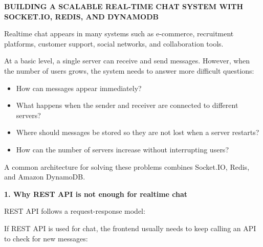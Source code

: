 \vspace{0.5em}\noindent\textbf{BUILDING A SCALABLE REAL-TIME CHAT SYSTEM WITH SOCKET.IO,
REDIS, AND
DYNAMODB}\par

Realtime chat appears in many systems such as e-commerce, recruitment
platforms, customer support, social networks, and collaboration tools.

At a basic level, a single server can receive and send messages.
However, when the number of users grows, the system needs to answer more
difficult questions:

\begin{itemize}
\tightlist
\item
  How can messages appear immediately?
\item
  What happens when the sender and receiver are connected to different
  servers?
\item
  Where should messages be stored so they are not lost when a server
  restarts?
\item
  How can the number of servers increase without interrupting users?
\end{itemize}

A common architecture for solving these problems combines Socket.IO,
Redis, and Amazon DynamoDB.

\vspace{0.5em}\noindent\textbf{1. Why REST API is not enough for realtime
chat}\par

REST API follows a request-response model:

\begin{Shaded}
\begin{Highlighting}[]
\end{Highlighting}
\end{Shaded}

If REST API is used for chat, the frontend usually needs to keep calling
an API to check for new messages:

\begin{Shaded}
\begin{Highlighting}[]
\end{Highlighting}
\end{Shaded}

